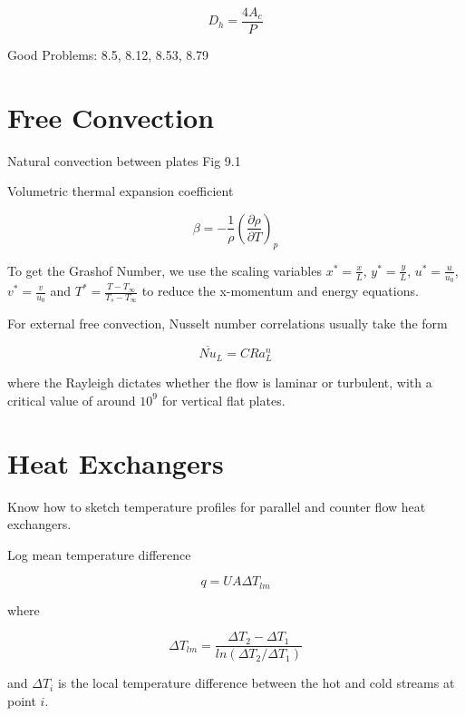 \documentclass[paper=letter, fontsize=11pt]{scrartcl}
\numberwithin{equation}{section}        %
\numberwithin{figure}{section}          %
\numberwithin{table}{section}               %
\begin{document}
\begin{equation}
D_h = \frac{4A_c}{P}
\end{equation}

\bigskip Good Problems: 8.5, 8.12, 8.53, 8.79


\section{Free Convection}

Natural convection between plates Fig 9.1

Volumetric thermal expansion coefficient 

\begin{equation}
\beta = -\frac{1}{\rho}\left(\frac{\partial\rho}{\partial T}\right)_p
\end{equation}

To get the Grashof Number, we use the scaling variables $x^\ast = \frac{x}{L}$, $y^\ast = \frac{y}{L}$, $u^\ast = \frac{u}{u_0}$, $v^\ast = \frac{v}{u_0}$ and $T^\ast = \frac{T-T_\infty}{T_s-T_\infty}$ to reduce the x-momentum and energy equations.

For external free convection, Nusselt number correlations usually take the form

\begin{equation}
\overline{Nu}_L = C Ra_L^n
\end{equation}

\noindent where the Rayleigh dictates whether the flow is laminar or turbulent, with a critical value of around $10^9$ for vertical flat plates.
    

\section{Heat Exchangers}

Know how to sketch temperature profiles for parallel and counter flow heat exchangers.

Log mean temperature difference 

\begin{equation}
q = UA\Delta T_{lm}
\end{equation}

\noindent where

\begin{equation}
\Delta T_{lm} = \frac{\Delta T_2 - \Delta T_1}{ln(\Delta T_2 / \Delta T_1)}
\end{equation}

\noindent and $\Delta T_i$ is the local temperature difference between the hot and cold streams at point $i$.
\end{document}
